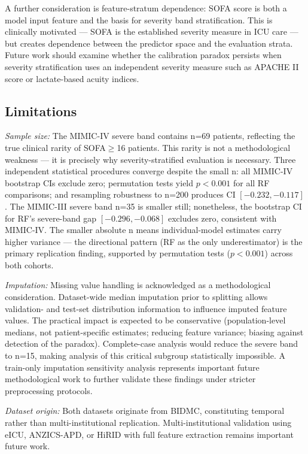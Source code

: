 \documentclass{ieeeaccess}
\begin{document}
A further consideration is feature-stratum dependence: SOFA score is both a model input feature and the basis for severity band stratification. This is clinically motivated — SOFA is the established severity measure in ICU care — but creates dependence between the predictor space and the evaluation strata. Future work should examine whether the calibration paradox persists when severity stratification uses an independent severity measure such as APACHE II score or lactate-based acuity indices.

\subsection{Limitations}
\label{sec:limitations}

\textit{Sample size:} The MIMIC-IV severe band contains n=69 patients, reflecting the true clinical rarity of SOFA$\ge$16 patients. This rarity is not a methodological weakness — it is precisely why severity-stratified evaluation is necessary. Three independent statistical procedures converge despite the small n: all MIMIC-IV bootstrap CIs exclude zero; permutation tests yield $p < 0.001$ for all RF comparisons; and resampling robustness to n=200 produces CI $[-0.232, -0.117]$. The MIMIC-III severe band n=35 is smaller still; nonetheless, the bootstrap CI for RF's severe-band gap $[-0.296, -0.068]$ excludes zero, consistent with MIMIC-IV. The smaller absolute n means individual-model estimates carry higher variance — the directional pattern (RF as the only underestimator) is the primary replication finding, supported by permutation tests ($p < 0.001$) across both cohorts.

\textit{Imputation:} Missing value handling is acknowledged as a methodological consideration. Dataset-wide median imputation prior to splitting allows validation- and test-set distribution information to influence imputed feature values. The practical impact is expected to be conservative (population-level medians, not patient-specific estimates; reducing feature variance; biasing against detection of the paradox). Complete-case analysis would reduce the severe band to n=15, making analysis of this critical subgroup statistically impossible. A train-only imputation sensitivity analysis represents important future methodological work to further validate these findings under stricter preprocessing protocols.

\textit{Dataset origin:} Both datasets originate from BIDMC, constituting temporal rather than multi-institutional replication. Multi-institutional validation using eICU, ANZICS-APD, or HiRID with full feature extraction remains important future work.
\end{document}
